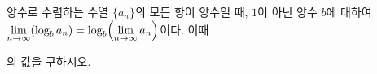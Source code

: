 양수로 수렴하는 수열 $\{a_n\}$의 모든 항이 양수일 때, $1$이 아닌 양수 $b$에 대하여 $\displaystyle\lim_{n\to\infty}(\log_b a_n)=\log_b\Bigl(\lim_{n\to\infty}a_n\Bigr)$이다. 이때 \par\smallskip{}\par\smallskip\noindent 의 값을 구하시오.

